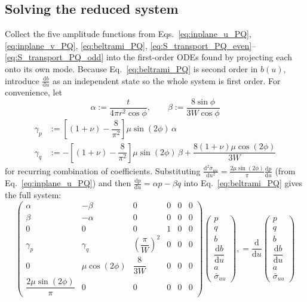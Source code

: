 \documentclass[11pt]{article}
\begin{document}
\subsection{Solving the reduced system}\label{sec:reduced_solve}
Collect the five amplitude functions from Eqs.~\eqref{eq:inplane_u_PQ}, \eqref{eq:inplane_v_PQ}, \eqref{eq:beltrami_PQ}, \eqref{eq:S_transport_PQ_even}--\eqref{eq:S_transport_PQ_odd} into the first-order ODEs found by projecting each onto its own mode. Because Eq.~\eqref{eq:beltrami_PQ} is second order in $b(u)$, introduce $\frac{\mathrm db}{\mathrm du}$ as an independent state so the whole system is first order. For convenience, let
\begin{equation}\label{eq:alpha_beta_def}
    \alpha := \frac{t}{4\pi r^2\cos\phi}, \qquad \beta := \frac{8\sin\phi}{3W\cos\phi}
\end{equation}
\begin{align}
\gamma_p&:=\left[(1+\nu)-\dfrac{8}{\pi^2}\right]\mu\sin(2\phi)\,\alpha\\
\gamma_q&:=-\left[(1+\nu)-\dfrac{8}{\pi^2}\right]\mu\sin(2\phi)\,\beta+\dfrac{8(1+\nu)\mu\cos(2\phi)}{3W}
\end{align}
for recurring combination of coefficients. Substituting $\frac{\mathrm d^2\bar\sigma_{uu}}{\mathrm du^2}=\frac{2\mu\sin(2\phi)}{\pi}\frac{\mathrm dp}{\mathrm du}$ (from Eq.~\ref{eq:inplane_u_PQ}) and then $\frac{\mathrm dp}{\mathrm du}=\alpha p-\beta q$ into Eq.~\eqref{eq:beltrami_PQ} gives the full system:
\begin{equation}\label{eq:full_system_ordered}
    \left(\begin{array}{cc|cc|c|c}
    \alpha & -\beta & 0 & 0 & 0 & 0\\
    \beta & -\alpha & 0 & 0 & 0 & 0\\
    \hline
    0 & 0 & 0 & 1 & 0 & 0\\
    \gamma_p & \gamma_q & \left(\dfrac{\pi}{W}\right)^2 & 0 & 0 & 0\\
    \hline
    0 & \mu\cos(2\phi) & \dfrac{8}{3W} & 0 & 0 & 0\\
    \hline
    \dfrac{2\mu\sin(2\phi)}{\pi} & 0 & 0 & 0 & 0 & 0
    \end{array}\right)
    \begin{pmatrix}p\\q\\b\\ \dfrac{\mathrm db}{\mathrm du}\\a\\ \bar\sigma_{uu}\end{pmatrix},
    =
    \frac{\mathrm d}{\mathrm du}\begin{pmatrix}p\\q\\b\\ \dfrac{\mathrm db}{\mathrm du}\\a\\ \bar\sigma_{uu}\end{pmatrix}
\end{equation}
\end{document}
